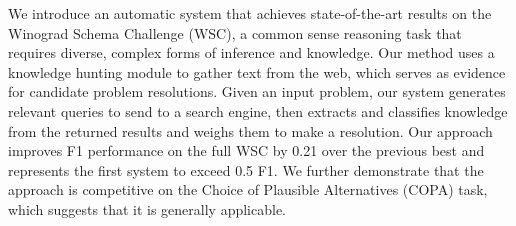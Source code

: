 We introduce an automatic system that achieves state-of-the-art results on the Winograd Schema Challenge (WSC), a common sense reasoning task that requires diverse, complex forms of inference and knowledge. Our method uses a knowledge hunting module to gather text from the web, which serves as evidence for candidate problem resolutions. Given an input problem, our system generates relevant queries to send to a search engine, then extracts and classifies knowledge from the returned results and weighs them to make a resolution. Our approach improves F1 performance on the full WSC by 0.21 over the previous best and represents the first system to exceed 0.5 F1. We further demonstrate that the approach is competitive on the Choice of Plausible Alternatives (COPA) task, which suggests that it is generally applicable.
